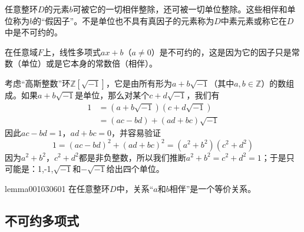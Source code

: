 任意整环$D$的元素$b$可被它的一切相伴整除，还可被一切单位整除。这些相伴和单位称为$b$的“假因子”。不是单位也不具有真因子的元素称为$D$中素元素或称它在$D$中是不可约的。

\begin{example}\label{exam001030605}
在任意域$F$上，线性多项式$ax+b$（$a \neq 0$）是不可约的，这是因为它的因子只是常数（单位）或是它本身的常数倍（相伴）。
\end{example}

\begin{example}\label{exam001030606}
考虑“高斯整数”环$\mathbb{Z}[\sqrt{-1}]$，它是由所有形为$a + b\sqrt{-1}$（其中$a, b \in \mathbb{Z}$）的数组成。如果$a + b\sqrt{-1}$是单位，那么对某个$c + d\sqrt{-1}$，我们有
\[
\begin{aligned}
1 &= (a + b\sqrt{-1})(c+d\sqrt{-1}) \\
&=(ac - bd) + (ad + bc)\sqrt{-1}
\end{aligned}
\]
因此$ac-bd = 1$，$ad+bc = 0$，并容易验证
\[
1 = (ac-bd)^2 + (ad+bc)^2 = (a^2+b^2)(c^2+d^2)
\]
因为$a^2+b^2$，$c^2+d^2$都是非负整数，所以我们推断$a^2+b^2=c^2+d^2=1$；于是只可能是：1,-1,$\sqrt{-1}$和$-\sqrt{-1}$给出四个单位。
\end{example}

\begin{lemma}{}{lemma001030601}
在任意整环$D$中，关系“$a$和$b$相伴”是一个等价关系。
\end{lemma}


\subsection{不可约多项式}\label{subsection0010307}



